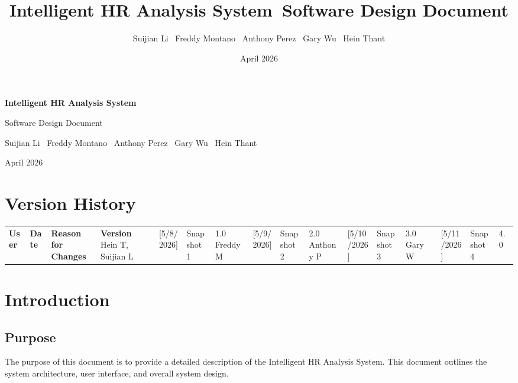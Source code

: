 \documentclass[12pt]{article}
\title{\textbf{Intelligent HR Analysis System}\
\large Software Design Document}
\author{Suijian Li \ Freddy Montano \ Anthony Perez \ Gary Wu \ Hein Thant}
\date{April 2026}
\begin{document}
\begin{titlepage}
\centering
\vspace*{2cm}

{\LARGE \textbf{Intelligent HR Analysis System} \par}
\vspace{1cm}

{\Large Software Design Document \par}
\vspace{2cm}

{\large
Suijian Li \
Freddy Montano \
Anthony Perez \
Gary Wu \
Hein Thant
\par}

\vfill

{\large April 2026 \par}

\end{titlepage}

\newpage
\tableofcontents
\newpage

\section*{Version History}

\begin{longtable}{|l|l|l|l|}
\hline
\textbf{User} & \textbf{Date} & \textbf{Reason for Changes} & \textbf{Version} \
\hline
Hein T, Suijian L & [5/8/2026] & Snapshot 1 & 1.0 \
\hline
Freddy M & [5/9/2026] & Snapshot 2 & 2.0 \
\hline
Anthony P & [5/10/2026] & Snapshot 3 & 3.0 \
\hline
Gary W & [5/11/2026] & Snapshot 4 & 4.0 \
\hline
\end{longtable}

\newpage

\section{Introduction}

\subsection{Purpose}
The purpose of this document is to provide a detailed description of the Intelligent HR Analysis System. This document outlines the system architecture, user interface, and overall system design.
\end{document}
